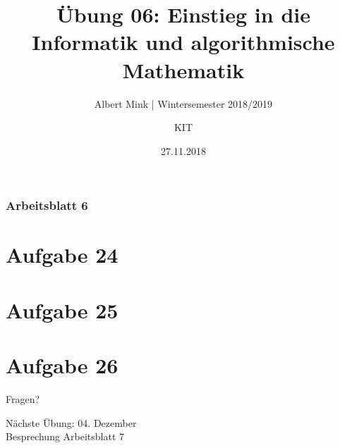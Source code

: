 \documentclass[c,18pt]{beamer}
\date{27.11.2018}
\title[Übung 06: Einstieg in die Informatik und algorithmische Mathematik]
  {Übung 06: Einstieg in die Informatik und algorithmische Mathematik}
\subtitle{Albert Mink | Wintersemester 2018/2019}
\author[Albert Mink, ]{KIT}
\institute[Institut für Angewandte und Numerische Mathematik (IANM)]{Institut für Angewandte und Numerische Mathematik}
\begin{document}
\begin{frame}
  \maketitle
\end{frame}

\begin{frame}
  \frametitle{Arbeitsblatt 6}%
\tableofcontents
\end{frame}
\setcounter{exercise}{23}

\section{Aufgabe 24}

\section{Aufgabe 25}

\section{Aufgabe 26}


\begin{frame}
\centering
\Huge\textcolor{KITgreen}{Fragen?}
\vspace{2cm}

{\LARGE
N\"achste \"Ubung: 04. Dezember\\
Besprechung Arbeitsblatt 7
}
\end{frame}


\end{document}
